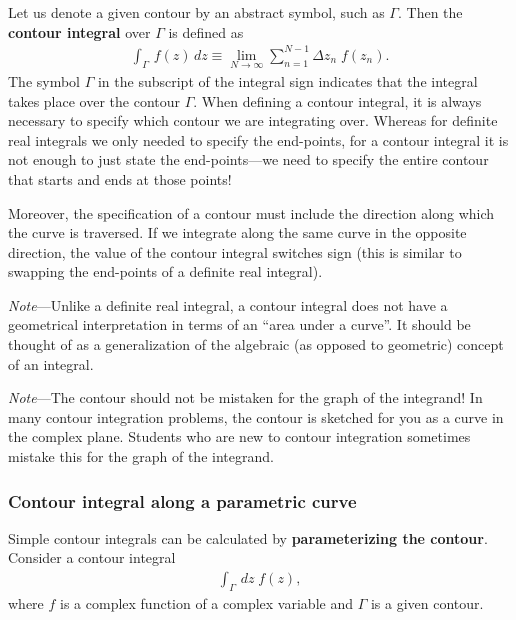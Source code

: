 \documentclass[10pt,a4paper]{article}
\begin{document}
Let us denote a given contour by an abstract symbol, such as
$\Gamma$. Then the \textbf{contour integral} over $\Gamma$ is defined
as
\begin{align}
  \int_\Gamma \, f(z)\, dz \equiv \lim_{N \rightarrow \infty} \sum_{n=1}^{N-1} \Delta z_n\; f(z_n).
\end{align}
The symbol $\Gamma$ in the subscript of the integral sign indicates
that the integral takes place over the contour $\Gamma$. When defining
a contour integral, it is always necessary to specify which contour we
are integrating over.  Whereas for definite real integrals we only
needed to specify the end-points, for a contour integral it is not
enough to just state the end-points---we need to specify the entire
contour that starts and ends at those points!

Moreover, the specification of a contour must include the direction
along which the curve is traversed. If we integrate along the same
curve in the opposite direction, the value of the contour integral
switches sign (this is similar to swapping the end-points of a
definite real integral).

\begin{framed}\noindent
  \textit{Note}---Unlike a definite real integral, a contour integral
  does not have a geometrical interpretation in terms of an ``area
  under a curve''. It should be thought of as a generalization of the
  algebraic (as opposed to geometric) concept of an integral.
\end{framed}

\begin{framed}\noindent
  \textit{Note}---The contour should not be mistaken for the graph of
  the integrand! In many contour integration problems, the contour is
  sketched for you as a curve in the complex plane. Students who are
  new to contour integration sometimes mistake this for the graph of
  the integrand.
\end{framed}

\subsubsection{Contour integral along a parametric curve}
\label{contour-integral-along-a-parametric-curve}

Simple contour integrals can be calculated by \textbf{parameterizing
  the contour}.  Consider a contour integral
\begin{align*}
  \int_\Gamma \, dz \; f(z),
\end{align*}
where $f$ is a complex function of a complex variable and $\Gamma$ is
a given contour.
\end{document}
